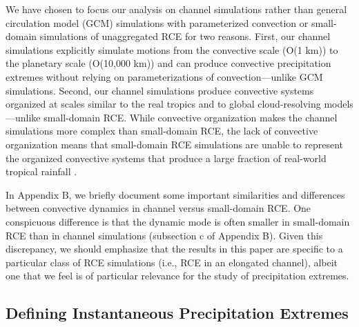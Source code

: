 \documentclass[twocol]{ametsoc}
\begin{document}
We have chosen to focus our analysis on channel simulations rather than general circulation model (GCM) simulations with parameterized convection or small-domain simulations of unaggregated RCE for two reasons. First, our channel simulations explicitly simulate motions from the convective scale (O(1 km)) to the planetary scale (O(10,000 km)) and can produce convective precipitation extremes without relying on parameterizations of convection---unlike GCM simulations. Second, our channel simulations produce convective systems organized at scales similar to the real tropics and to global cloud-resolving models \citep{Cronin2017CloudsModel,Beucler2019ComparingEquator}---unlike small-domain RCE. While convective organization makes the channel simulations more complex than small-domain RCE, the lack of convective organization means that small-domain RCE simulations are unable to represent the organized convective systems that produce a large fraction of real-world tropical rainfall \citep[e.g.][]{Nesbitt2006StormFeatures}.

In Appendix B, we briefly document some important similarities and differences between convective dynamics in channel versus small-domain RCE. One conspicuous difference is that the dynamic mode is often smaller in small-domain RCE than in channel simulations (subsection c of Appendix B). Given this discrepancy, we should emphasize that the results in this paper are specific to a particular class of RCE simulations (i.e., RCE in an elongated channel), albeit one that we feel is of particular relevance for the study of precipitation extremes.

\subsection{Defining Instantaneous Precipitation Extremes}
\end{document}
